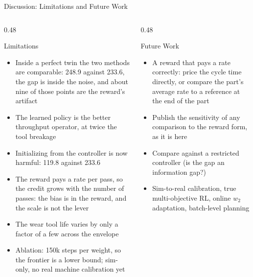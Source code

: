 ﻿\documentclass[11pt,aspectratio=169]{beamer}
\begin{document}
\begin{frame}{Discussion: Limitations and Future Work}
    \scriptsize
    \begin{columns}[T]
        \begin{column}{0.48\textwidth}
            \begin{alertblock}{Limitations}
            \begin{itemize}
                \item Inside a perfect twin the two methods are comparable: 248.9 against 233.6, the gap is inside the noise, and about nine of those points are the reward's artifact
                \item The learned policy is the better throughput operator, at twice the tool breakage
                \item Initializing from the controller is now \alert{harmful}: 119.8 against 233.6
                \item The reward pays a rate per pass, so the credit grows with the number of passes: the bias is in the reward, and the scale is not the lever
                \item The wear tool life varies by only a factor of a few across the envelope
                \item Ablation: 150k steps per weight, so the frontier is a lower bound; sim-only, no real machine calibration yet
            \end{itemize}
            \end{alertblock}
        \end{column}
        \begin{column}{0.48\textwidth}
            \begin{exampleblock}{Future Work}
            \begin{itemize}
                \item \alert{A reward that pays a rate correctly}: price the cycle time directly, or compare the part's average rate to a reference at the end of the part
                \item Publish the sensitivity of any comparison to the reward form, as it is here
                \item Compare against a restricted controller (is the gap an information gap?)
                \item Sim-to-real calibration, true multi-objective RL, online $w_2$ adaptation, batch-level planning
            \end{itemize}
            \end{exampleblock}
        \end{column}
    \end{columns}
\end{frame}
\end{document}
